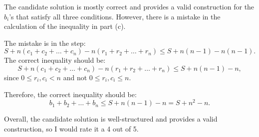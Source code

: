 The candidate solution is mostly correct and provides a valid construction for the $b_i$'s that satisfy all three conditions. However, there is a mistake in the calculation of the inequality in part (c).

The mistake is in the step:
\[
S + n(c_1 + c_2 + \dots + c_n) - n(r_1 + r_2 + \dots + r_n) \le S + n(n-1) - n(n-1).
\]
The correct inequality should be:
\[
S + n(c_1 + c_2 + \dots + c_n) - n(r_1 + r_2 + \dots + r_n) \le S + n(n-1) - n,
\]
since $0 \le r_i, c_i < n$ and not $0 \le r_i, c_i \le n$.

Therefore, the correct inequality should be:
\[
b_1 + b_2 + \dots + b_n \le S + n(n-1) - n = S + n^2 - n.
\]

Overall, the candidate solution is well-structured and provides a valid construction, so I would rate it a 4 out of 5.
